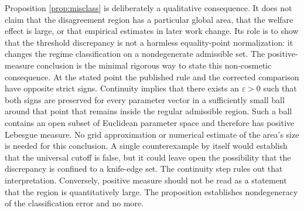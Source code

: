 Proposition \ref{prop:misclass} is deliberately a qualitative consequence. It does not claim that the disagreement region has a particular global area, that the welfare effect is large, or that empirical estimates in later work change. Its role is to show that the threshold discrepancy is not a harmless equality-point normalization: it changes the regime classification on a nondegenerate admissible set. The positive-measure conclusion is the minimal rigorous way to state this non-cosmetic consequence. At the stated point the published rule and the corrected comparison have opposite strict signs. Continuity implies that there exists an $\varepsilon>0$ such that both signs are preserved for every parameter vector in a sufficiently small ball around that point that remains inside the regular admissible region. Such a ball contains an open subset of Euclidean parameter space and therefore has positive Lebesgue measure. No grid approximation or numerical estimate of the area's size is needed for this conclusion. A single counterexample by itself would establish that the universal cutoff is false, but it could leave open the possibility that the discrepancy is confined to a knife-edge set. The continuity step rules out that interpretation. Conversely, positive measure should not be read as a statement that the region is quantitatively large. The proposition establishes nondegeneracy of the classification error and no more.
